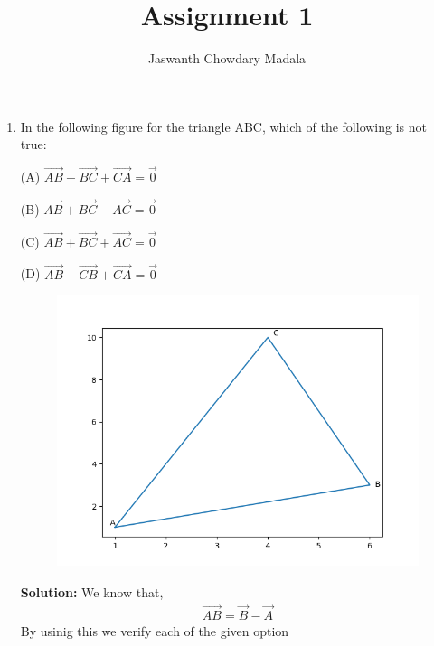 \documentclass[journal,12pt,twocolumn]{IEEEtran}
\begin{document}
\vspace{3cm}


\title{Assignment 1}
\author{Jaswanth Chowdary Madala}





\maketitle

\newpage


\bigskip

\renewcommand{\thefigure}{\theenumi}
\renewcommand{\thetable}{\theenumi}

\begin{enumerate}
\item In the following figure for the triangle ABC, which of the following is not true:

(A) $\overrightarrow{AB}+\overrightarrow{BC}+\overrightarrow{CA} = \overrightarrow{0}$

(B) $\overrightarrow{AB}+\overrightarrow{BC}-\overrightarrow{AC} = \overrightarrow{0}$

(C) $\overrightarrow{AB}+\overrightarrow{BC}+\overrightarrow{AC} = \overrightarrow{0}$

(D) $\overrightarrow{AB}-\overrightarrow{CB}+\overrightarrow{CA} = \overrightarrow{0}$

\begin{figure}[h]
\centering
\includegraphics[scale=0.5]{./figs/fig1.png}
\end{figure}
\textbf{Solution:} We know that,
\begin{align}
\overrightarrow{AB} = \vec{B} - \vec{A}
\end{align}
By usinig this we verify each of the given option


\end{enumerate}
\end{document}
